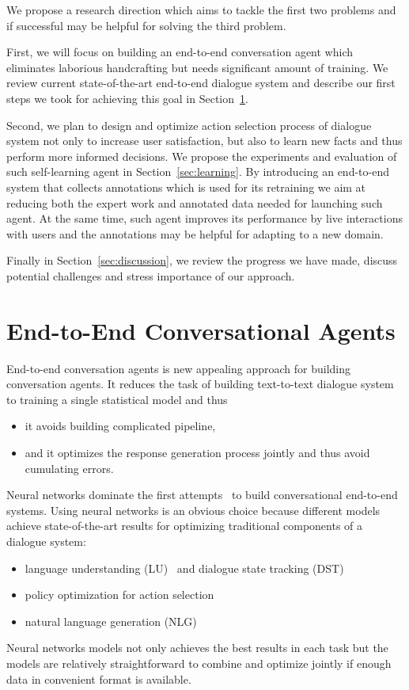 \documentclass[11pt]{article}
\begin{document}
We propose a research direction which aims to tackle the first two problems and if successful may be helpful for solving the third problem.

First, we will focus on building an end-to-end conversation agent which eliminates laborious handcrafting but needs significant amount of training. 
We review current state-of-the-art end-to-end dialogue system and describe our first steps we took for achieving this goal in Section~\ref{sec:e2end}.

Second, we plan to design and optimize action selection process of dialogue system not only to increase user satisfaction, but also to learn new facts and thus perform more informed decisions.
We propose the experiments and evaluation of such self-learning agent in Section~\ref{sec:learning}.
By introducing an end-to-end system that collects annotations which is used for its retraining we aim at reducing both the expert work and annotated data needed for launching such agent.
At the same time, such agent improves its performance by live interactions with users and the annotations may be helpful for adapting to a new domain.

Finally in Section~\ref{sec:discussion}, we review the progress we have made, discuss potential challenges and stress importance of our approach.

\section{End-to-End Conversational Agents}
\label{sec:e2end}
End-to-end conversation agents is new appealing approach for building conversation agents.
It reduces the task of building text-to-text dialogue system to training a single statistical model and thus
\begin{itemize}
    \item it avoids building complicated pipeline,
    \item and it optimizes the response generation process jointly and thus avoid cumulating errors.
\end{itemize}

Neural networks dominate the first attempts~\cite{williams2016end,bordes_learning_2016,weston2015endtoend_prereq} to build conversational end-to-end systems.
Using neural networks is an obvious choice because different models achieve state-of-the-art results for optimizing traditional components of a dialogue system:
\begin{itemize}
    \item language understanding (LU)~\cite{mairesse_spoken_2009} and dialogue state tracking (DST)~\cite{williams_web-style_2014,henderson2014word,vodolan_hybrid_2015,platek_recurrent_2016}
    \item policy optimization for action selection~\cite{gasic_line_2011}
    \item natural language generation (NLG)~\cite{dusek_sequence2sequence_2016,wen_networkbased_2016}
\end{itemize}
Neural networks models not only achieves the best results in each task but the models are relatively straightforward to combine and optimize jointly if enough data in convenient format is available.
\end{document}
